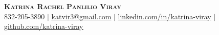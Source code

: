 \begin{center}
	\textbf{\Huge \scshape Katrina Rachel Panlilio Viray} \\ \vspace{1pt}
		\small 832-205-3890 $|$
		\href{mailto:katvir3@gmail.com}{\underline{katvir3@gmail.com}} $|$
		\href{https://www.linkedin.com/in/katrina-viray}{\underline{linkedin.com/in/katrina-viray}} $|$
		\href{https://github.com/katrina-viray}{\underline{github.com/katrina-viray}}
	\end{center}